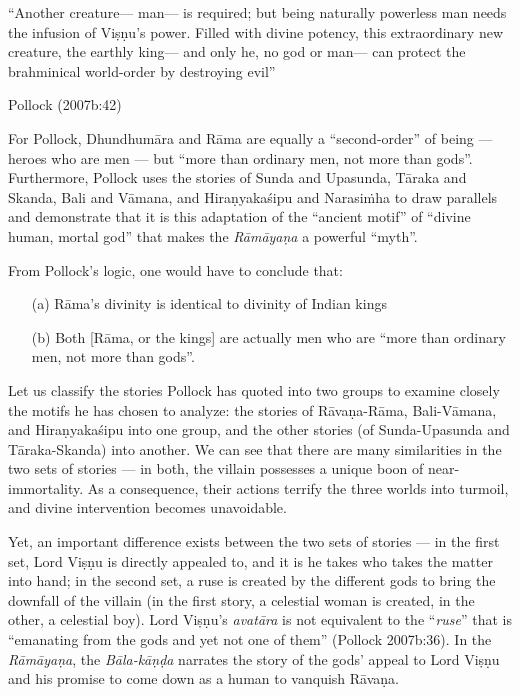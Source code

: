 \begin{myquote}
“Another creature--- man--- is required; but being naturally powerless man needs the infusion of Viṣṇu’s power. Filled with divine potency, this extraordinary new creature, the earthly king--- and only he, no god or man--- can protect the brahminical world-order by destroying evil”

\hfill Pollock (2007b:42)
\end{myquote}

For Pollock, Dhundhumāra and Rāma are equally a “second-order” of being --- heroes who are men --- but “more than ordinary men, not more than gods”. Furthermore, Pollock uses the stories of Sunda and Upasunda, Tāraka and Skanda, Bali and Vāmana, and Hiraṇyakaśipu and Narasiṁha to draw parallels and demonstrate that it is this adaptation of the “ancient motif” of “divine human, mortal god” that makes the {\sl Rāmāyaṇa} a powerful “myth”. 

From Pollock’s logic, one would have to conclude that: 
\begin{itemize}
\itemsep=0pt
\item[(a)] Rāma’s divinity is identical to divinity of Indian kings 
\item[(b)] Both [Rāma, or the kings] are actually men who are “more than ordinary men, not more than gods”.  
\end{itemize}
Let us classify the stories Pollock has quoted into two groups to examine closely the motifs he has chosen to analyze: the stories of Rāvaṇa-Rāma, Bali-Vāmana, and Hiraṇyakaśipu into one group, and the other stories (of Sunda-Upasunda and Tāraka-Skanda) into another. We can see that there are many similarities in the two sets of stories --- in both, the villain possesses a unique boon of near- immortality. As a consequence, their actions terrify the three worlds into turmoil, and divine intervention becomes unavoidable. 

Yet, an important difference exists between the two sets of stories --- in the first set, Lord Viṣṇu is directly appealed to, and it is he takes who takes the matter into hand; in the second set, a ruse is created by the different gods to bring the downfall of the villain (in the first story, a celestial woman is created, in the other, a celestial boy). Lord Viṣṇu’s {\sl avatāra} is not equivalent to the “{\sl ruse}” that is “emanating from the gods and yet not one of them” (Pollock 2007b:36). In the {\sl Rāmāyaṇa}, the {\sl Bāla-kāṇḍa} narrates the story of the gods’ appeal to Lord Viṣṇu and his promise to come down as a human to vanquish Rāvaṇa. 


